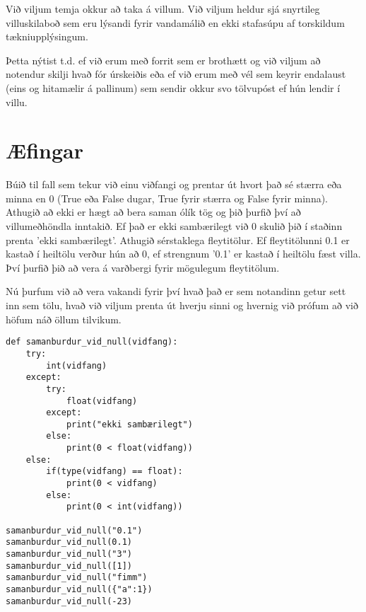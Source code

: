 Við viljum temja okkur að taka á villum.
Við viljum heldur sjá snyrtileg villuskilaboð sem eru lýsandi fyrir vandamálið en ekki stafasúpu af torskildum tækniupplýsingum.

Þetta nýtist t.d. ef við erum með forrit sem er brothætt og við viljum að notendur skilji hvað fór úrskeiðis eða ef við erum með vél sem keyrir endalaust (eins og hitamælir á pallinum) sem sendir okkur svo tölvupóst ef hún lendir í villu.







\newpage
\section{Æfingar}
\begin{exercise}\label{vil1}
Búið til fall sem tekur við einu viðfangi og prentar út hvort það sé stærra eða minna en 0 (True eða False dugar, True fyrir stærra og False fyrir minna).
Athugið að ekki er hægt að bera saman ólík tög og þið þurfið því að villumeðhöndla inntakið.
Ef það er ekki sambærilegt við 0 skulið þið í staðinn prenta 'ekki sambærilegt'.
Athugið sérstaklega fleytitölur.
Ef fleytitölunni 0.1 er kastað í heiltölu verður hún að 0, ef strengnum '0.1' er kastað í heiltölu fæst villa.
Því þurfið þið að vera á varðbergi fyrir mögulegum fleytitölum.
\end{exercise}
\begin{Answer}[ref={vil1}]
Nú þurfum við að vera vakandi fyrir því hvað það er sem notandinn getur sett inn sem tölu, hvað við viljum prenta út hverju sinni og hvernig við prófum að við höfum náð öllum tilvikum.
	\begin{lstlisting}
def samanburdur_vid_null(vidfang):
	try:
		int(vidfang)
	except:
		try:
			float(vidfang)
		except:
			print("ekki sambærilegt")
		else:
			print(0 < float(vidfang))
	else:
		if(type(vidfang) == float):
			print(0 < vidfang)
		else:
			print(0 < int(vidfang))

samanburdur_vid_null("0.1")
samanburdur_vid_null(0.1)
samanburdur_vid_null("3")
samanburdur_vid_null([1])
samanburdur_vid_null("fimm")
samanburdur_vid_null({"a":1})
samanburdur_vid_null(-23)
	\end{lstlisting}
\end{Answer}


